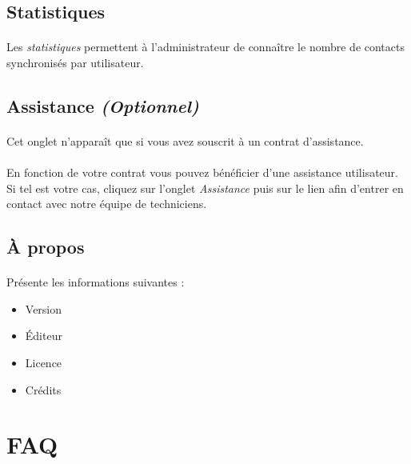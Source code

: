 \documentclass[12pt,a4paper,titlepage]{article}
\begin{document}
		\subsection{Statistiques}
		
		\paragraph{}
		Les \emph{statistiques} permettent à l'administrateur de connaître le nombre de contacts synchronisés par utilisateur.
		
		\subsection{Assistance \textit{(Optionnel)}}
		
		\paragraph{}
		Cet onglet n'apparaît que si vous avez souscrit à un contrat d'assistance.		
		
		\paragraph{}
		En fonction de votre contrat vous pouvez bénéficier d'une assistance utilisateur.
		Si tel est votre cas, cliquez sur l'onglet \emph{Assistance} puis sur le lien afin d'entrer en contact avec notre équipe de techniciens.
		
	
		\subsection{À propos}
		\paragraph{}
		Présente les informations suivantes :
		
		\begin{itemize}
			\item Version
			\item Éditeur
			\item Licence
			\item Crédits	
		\end{itemize}
	
	\section{FAQ}
\end{document}
